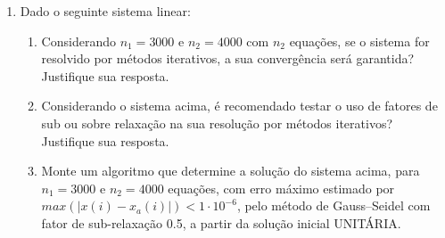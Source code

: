 \documentclass[12pt]{article}
\newenvironment{smallitem}{
    \vspace{-2mm}
    \begin{enumerate}
    \setlength{\parskip}{0pt}
    \setlength{\itemsep}{2pt}
}{
    \vspace{-2mm}
    \end{enumerate}
}
\begin{document}
\begin{enumerate}[label=\textbf{\arabic*})]
\begin{smallitem}
\item Determine o resíduo máximo do sistema acima com a solução $x$ obtida e
avalie se este resíduo é satisfatório (de acordo com o número de dígitos
significativos que usar);

\item Monte um algoritmo \verb!x = fsubstituicoesf(n, A)!, que determine e
retorne a solução $x$ do sistema $A_0 \cdot x = b$, a partir das entradas $n$ e
$A$ ($L \cdot U = A_0$ e $A = \begin{bmatrix} L $\textbackslash$ U & b
\end{bmatrix}$, matriz expandida que contém $L$ e $U$ (sobrepostas) e
concatenadas com $b$ em $n$ linhas e $n + 1$ colunas), resolvendo as duas
substituições $L \cdot c = b$ e $U \cdot x = c$;

\item Monte um algoritmo \verb!LU = fLU(n, A)!, que determine e retorne a matriz
expandida decomposta $LU$, com as matrizes $L$ e $U$ (sobrepostas) e
concatenadas com $b$, $LU = \begin{bmatrix} L $\textbackslash$ U & b
\end{bmatrix}$, com pivotação parcial interna, através da função
\verb!A = fpivotacao(n, A, k)! - que determina a matriz expandida $A$ com linha
$k$ com o maior coeficiente em módulo na coluna $k$, onde
$A = \begin{bmatrix} A_0 & b \end{bmatrix}$ e $A_0 \cdot x = b$.

\end{smallitem}

\item Dado o seguinte sistema linear:

\begin{smallitem}

\item Considerando $n_1 = 3000$ e $n_2 = 4000$ com $n_2$ equações, se o sistema
for resolvido por métodos iterativos, a sua convergência será garantida?
Justifique sua resposta.

\item Considerando o sistema acima, é recomendado testar o uso de fatores de sub
ou sobre relaxação na sua resolução por métodos iterativos? Justifique sua
resposta.

\item Monte um algoritmo que determine a solução do sistema acima, para $n_1 =
3000$ e $n_2 = 4000$ equações, com erro máximo estimado por $max(\vert x(i) -
x_a(i) \vert) < 1 \cdot 10^{-6}$, pelo método de Gauss--Seidel com fator de
sub-relaxação 0.5, a partir da solução inicial UNITÁRIA.


\end{smallitem}
\end{enumerate}
\end{document}

